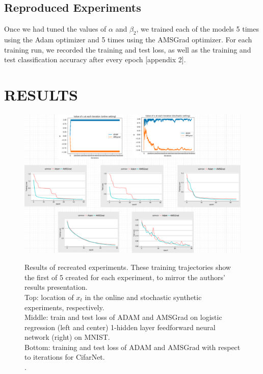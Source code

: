 \documentclass[letterpaper, 10 pt, conference]{ieeeconf}  %
\begin{document}
\subsection{Reproduced Experiments}

Once we had tuned the values of $\alpha$ and $\beta_2$, we trained each of the models 5 times using the Adam optimizer and 5 times using the AMSGrad optimizer. For each training run, we recorded the training and test loss, as well as the training and test classification accuracy after every epoch [appendix 2].

\section{RESULTS}

\begin{figure}
\begin{minipage}{1\textwidth}
  \centering
  \includegraphics[width=1\linewidth]{Our_Results.png}
  \label{fig:test2}
\end{minipage}%
\caption[]{Results of recreated experiments. These training trajectories show the first of 5 created for each experiment, to mirror the authors' results presentation.\\
Top: location of $x_t$ in the online and stochastic synthetic experiments, respectively. \\
Middle: train and test loss of ADAM and AMSGrad on logistic regression (left and center) 1-hidden layer feedforward neural network (right) on MNIST.\\
Bottom: training and test loss of ADAM and AMSGrad with respect to iterations for CifarNet.\\.} 
\end{figure}  
\end{document}
